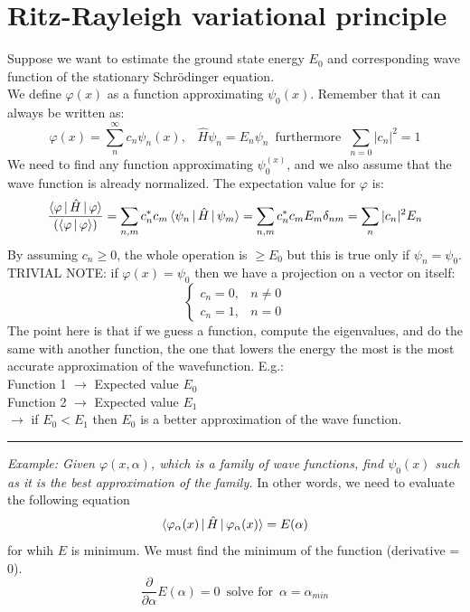 \section{Ritz-Rayleigh variational principle}
Suppose we want to estimate the ground state energy $E_0$ and corresponding wave function of the stationary Schr\"{o}dinger equation.\\
We define $\varphi(x)$ as a function approximating $\psi_0(x)$. Remember that it can always be written as:
\[
\varphi(x)=\sum_{n}^{\infty}c_n\psi_n(x),\;\;\; \hat{H}\psi_n=E_n\psi_n\, \text{ furthermore} \;\; \sum_{n=0}|c_n|^2=1
\]
We need to find any function approximating $\psi_0^{(x)}$, and we also assume that the wave function is already normalized. The expectation value for $\varphi$ is:
\[
\frac{\braket{\varphi\,|\,\hat{H}\,|\,\varphi}}{(\braket{\varphi \,|\, \varphi})}=
\sum_{n,m}c_n^{*}c_m\braket{\psi_n\,|\,\hat{H}\,|\,\psi_m}=\sum_{n,m}c_n^{*}c_mE_m\delta_{nm}=
\sum_{n}|c_n|^2E_n
\]
By assuming $c_n \geq 0$, the whole operation is $\geq E_0$ but this is true only if $\psi_n=\psi_0$.\\
\newline
TRIVIAL NOTE: if $\varphi(x)=\psi_0$ then we have a projection on a vector on itself:
\[
\begin{cases}
c_n=0, & n \neq 0\\
c_n=1, & n=0
\end{cases}
\]
\newline
The point here is that if we guess a function, compute the eigenvalues, and do the same with another function, the one that lowers the energy the most is the most accurate approximation of the wavefunction. E.g.:\\
Function 1 $\rightarrow$ Expected value $E_0$\\
Function 2 $\rightarrow$ Expected value $E_1$\\
$\rightarrow$ if $E_0 < E_1$ then $E_0$ is a better approximation of the wave function.\\
\newline
\noindent\rule{4cm}{0.1pt}
\newline
\textit{Example: Given $\varphi(x, \alpha)$, which is a family of wave functions, find $\psi_0(x)$ such as it is the best approximation of the family.} In other words, we need to evaluate the following equation\\
\[
\braket{\varphi_{\alpha}(x)\,|\,\hat{H}\,|\,\varphi_{\alpha}(x)}=E(\alpha)
\]
for whih $E$ is minimum. We must find the minimum of the function (derivative = 0).
\[
\frac{\partial}{\partial\alpha}E(\alpha)=0\, \text{  solve for  }\, \alpha=\alpha_{min}
\]
